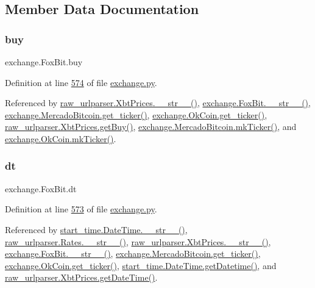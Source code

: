 \subsection{Member Data Documentation}
\mbox{\label{classexchange_1_1_fox_bit_acb7e709cc05e8314b1bdacd32e4dfc80}} 
\subsubsection{\texorpdfstring{buy}{buy}}
{\footnotesize\ttfamily exchange.\+Fox\+Bit.\+buy}



Definition at line \hyperlink{exchange_8py_source_l00574}{574} of file \hyperlink{exchange_8py_source}{exchange.\+py}.



Referenced by \hyperlink{raw__urlparser_8py_source_l00074}{raw\+\_\+urlparser.\+Xbt\+Prices.\+\_\+\+\_\+str\+\_\+\+\_\+()}, \hyperlink{exchange_8py_source_l00610}{exchange.\+Fox\+Bit.\+\_\+\+\_\+str\+\_\+\+\_\+()}, \hyperlink{exchange_8py_source_l00651}{exchange.\+Mercado\+Bitcoin.\+get\+\_\+ticker()}, \hyperlink{exchange_8py_source_l00716}{exchange.\+Ok\+Coin.\+get\+\_\+ticker()}, \hyperlink{raw__urlparser_8py_source_l00062}{raw\+\_\+urlparser.\+Xbt\+Prices.\+get\+Buy()}, \hyperlink{exchange_8py_source_l00665}{exchange.\+Mercado\+Bitcoin.\+mk\+Ticker()}, and \hyperlink{exchange_8py_source_l00730}{exchange.\+Ok\+Coin.\+mk\+Ticker()}.

\mbox{\label{classexchange_1_1_fox_bit_a363f8488eb0423f88519c085ae6f168f}} 
\subsubsection{\texorpdfstring{dt}{dt}}
{\footnotesize\ttfamily exchange.\+Fox\+Bit.\+dt}



Definition at line \hyperlink{exchange_8py_source_l00573}{573} of file \hyperlink{exchange_8py_source}{exchange.\+py}.



Referenced by \hyperlink{start__time_2____init_____8py_source_l00034}{start\+\_\+time.\+Date\+Time.\+\_\+\+\_\+str\+\_\+\+\_\+()}, \hyperlink{raw__urlparser_8py_source_l00038}{raw\+\_\+urlparser.\+Rates.\+\_\+\+\_\+str\+\_\+\+\_\+()}, \hyperlink{raw__urlparser_8py_source_l00074}{raw\+\_\+urlparser.\+Xbt\+Prices.\+\_\+\+\_\+str\+\_\+\+\_\+()}, \hyperlink{exchange_8py_source_l00610}{exchange.\+Fox\+Bit.\+\_\+\+\_\+str\+\_\+\+\_\+()}, \hyperlink{exchange_8py_source_l00651}{exchange.\+Mercado\+Bitcoin.\+get\+\_\+ticker()}, \hyperlink{exchange_8py_source_l00716}{exchange.\+Ok\+Coin.\+get\+\_\+ticker()}, \hyperlink{start__time_2____init_____8py_source_l00031}{start\+\_\+time.\+Date\+Time.\+get\+Datetime()}, and \hyperlink{raw__urlparser_8py_source_l00059}{raw\+\_\+urlparser.\+Xbt\+Prices.\+get\+Date\+Time()}.

